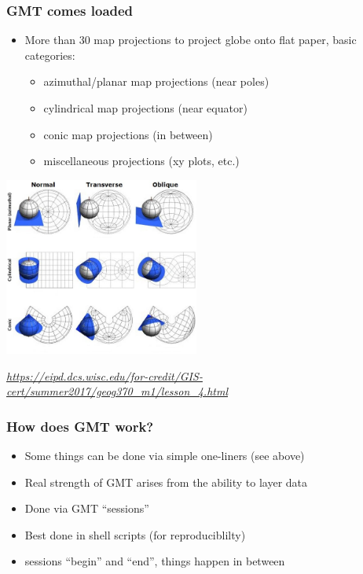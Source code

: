 \documentclass[unknownkeysallowed]{beamer}
\begin{document}
\begin{frame}
\frametitle{GMT comes loaded}
	\begin{itemize}
		\item More than 30 map projections to project globe onto flat paper, basic categories:
		\begin{itemize}	
			\item azimuthal/planar map projections (near poles)
			\item cylindrical map projections (near equator)
			\item conic map projections (in between)
			\item miscellaneous projections (xy plots, etc.)
		\end{itemize}
	\end{itemize}
	\begin{center}
			\includegraphics[width=0.48\textwidth]{../figures/map_projections.jpg}	
	\end{center}
	\begin{flushright}
	\vspace{-0.35cm}
	\tiny{\emph{\url{https://eipd.dcs.wisc.edu/for-credit/GIS-cert/summer2017/geog370_m1/lesson_4.html}}}
	\end{flushright}	

\end{frame}

\begin{frame}
\frametitle{How does GMT work?}
	\begin{itemize}
		\item Some things can be done via simple one-liners (see above)
		\item Real strength of GMT arises from the ability to layer data
		\item Done via GMT ``sessions''
		\item Best done in shell scripts (for reproduciblilty)
		\item sessions ``begin'' and ``end'', things happen in between 
	\end{itemize}
\end{frame}
\end{document}
